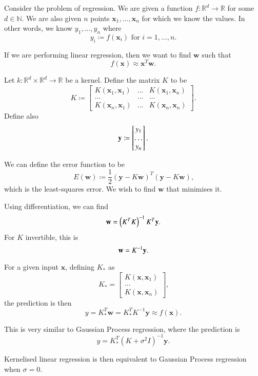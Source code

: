 \documentclass[11pt, oneside]{article}
\newcommand{\bw}{\mathbf{w}}
\newcommand{\bx}{\mathbf{x}}
\newcommand{\by}{\mathbf{y}}
\newcommand{\bbN}{\mathbb{N}}
\newcommand{\bbR}{\mathbb{R}}
\begin{document}
Consider the problem of regression. We are given a function $f : \bbR^d \to \bbR$ for some $d \in \bbN$. We are also given $n$ points $\bx_1, \dots, \bx_n$ for which we know the values. In other words, we know $y_1, \dots, y_n$ where \[
    y_i \coloneqq f(\bx_i)\text{ for }i = 1, \dots, n\text{.}
\]

If we are performing linear regression, then we want to find $\bw$ such that \[
    f(\bx) \approx \bx^T\bw \text{.}
\]

Let $k : \bbR^d \times \bbR^d \to \bbR$ be a kernel. Define the matrix $K$ to be \[
    K \coloneqq \begin{bmatrix}
        K(\bx_1, \bx_1) & \dots & K(\bx_1, \bx_n) \\
        \dots & \dots & \dots \\
        K(\bx_n, \bx_1) & \dots & K(\bx_n, \bx_n)
    \end{bmatrix} \text{.}
\] Define also\[
    \by \coloneqq \begin{bmatrix}
        y_1 \\
        \dots \\
        y_n
    \end{bmatrix} \text.
\]

We can define the error function to be \[
    E(\bw) \coloneqq \frac12 \left(\by - K \bw\right)^T\left(\by - K \bw\right) \text{,}
\] which is the least-squares error. We wish to find $\bw$ that minimises it.

Using differentiation, we can find\[
    \bw = \left(K^T K \right)^{-1} K^T \by \text.
\] For $K$ invertible, this is \[
    \bw = K^{-1}\by\text.
\]

For a given input $\bx$, defining $K_*$ as \[
    K_* = \begin{bmatrix}
        K(\bx, \bx_1) \\
        \dots \\
        K(\bx, \bx_n)
    \end{bmatrix} \text{,}
\]the prediction  is then \[
    y = K_*^T\bw = K_*^T K^{-1}\by \approx f(\bx) \text{.}
\]

This is very similar to Gaussian Process regression, where the prediction is \[
    y = K_*^T\left(K + \sigma^2 I\right)^{-1}\by \text{.}
\]

Kernelised linear regression is then equivalent to Gaussian Process regression when $\sigma = 0$.
\end{document}
